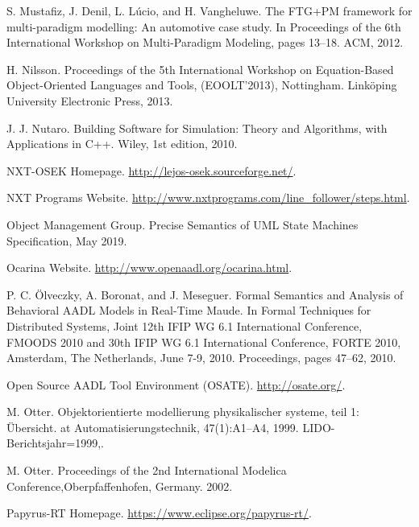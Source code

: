 \begin{description}[style=nextline,leftmargin=12mm,labelwidth=10mm,font=\normalfont]
\item[{[216]}] S. Mustafiz, J. Denil, L. Lúcio, and H. Vangheluwe. The FTG+PM framework for multi-paradigm modelling: An automotive case study. In Proceedings of the 6th International Workshop on Multi-Paradigm Modeling, pages 13–18. ACM, 2012.

\item[{[217]}] H. Nilsson. Proceedings of the 5th International Workshop on Equation-Based Object-Oriented Languages and Tools, (EOOLT’2013), Nottingham. Linköping University Electronic Press, 2013.

\item[{[218]}] J. J. Nutaro. Building Software for Simulation: Theory and Algorithms, with Applications in C++. Wiley, 1st edition, 2010.

\item[{[219]}] NXT-OSEK Homepage. \url{http://lejos-osek.sourceforge.net/}.

\item[{[220]}] NXT Programs Website. \url{http://www.nxtprograms.com/line_follower/steps.html}.

\item[{[221]}] Object Management Group. Precise Semantics of UML State Machines Specification, May 2019.

\item[{[222]}] Ocarina Website. \url{http://www.openaadl.org/ocarina.html}.

\item[{[223]}] P. C. Ölveczky, A. Boronat, and J. Meseguer. Formal Semantics and Analysis of Behavioral AADL Models in Real-Time Maude. In Formal Techniques for Distributed Systems, Joint 12th IFIP WG 6.1 International Conference, FMOODS 2010 and 30th IFIP WG 6.1 International Conference, FORTE 2010, Amsterdam, The Netherlands, June 7-9, 2010. Proceedings, pages 47–62, 2010.

\item[{[224]}] Open Source AADL Tool Environment (OSATE). \url{http://osate.org/}.

\item[{[225]}] M. Otter. Objektorientierte modellierung physikalischer systeme, teil 1: Übersicht. at Automatisierungstechnik, 47(1):A1–A4, 1999. LIDO-Berichtsjahr=1999,.

\item[{[226]}] M. Otter. Proceedings of the 2nd International Modelica Conference,Oberpfaffenhofen, Germany. 2002.

\item[{[227]}] Papyrus-RT Homepage. \url{https://www.eclipse.org/papyrus-rt/}.


\end{description}
